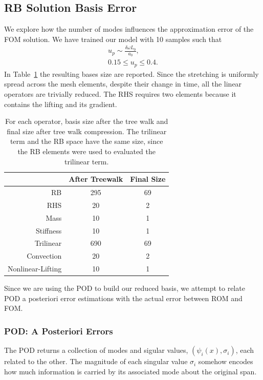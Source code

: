 \documentclass[../../thesis.tex]{subfiles}
\begin{document}
\subsection{RB Solution Basis Error}
\label{sec:hrom_results_reduced_basis}
We explore how the number of modes influences the approximation error of the FOM solution.
We have trained our model with 10 samples such that
\begin{align*}
    u_p \sim \frac{\delta \omega L_0}{a_0},
    \nonumber
    \\
    0.15 \leq u_p \leq 0.4.
\end{align*}
In Table~\ref{tab:uniform_stretching_basis_size} the resulting bases size are reported.
Since the stretching is uniformly spread across the mesh elements, despite their change in time,
all the linear operators are trivially reduced.
The RHS requires two elements because it contains the lifting and its gradient.
\begin{table}[!h]
    \caption{For each operator,
    basis size after the tree walk and final size after tree walk compression.
    The trilinear term and the RB space have the same size, 
    since the RB elements were used to evaluated the trilinear term.}
    \centering
    \begin{tabular}{@{}rcc@{}}
    \toprule
                      & After Treewalk & Final Size \\ \midrule
    RB                & 295            & 69                \\
    RHS               & 20             & 2                 \\
    Mass              & 10             & 1                 \\
    Stiffness         & 10             & 1                 \\
    Trilinear         & 690            & 69                \\
    Convection        & 20             & 2                 \\
    Nonlinear-Lifting & 10             & 1                 \\ \bottomrule
    \end{tabular}
    \label{tab:uniform_stretching_basis_size}
\end{table}
Since we are using the POD to build our reduced basis, 
we attempt to relate POD a posteriori error estimations with 
the actual error between ROM and FOM.

\subsubsection{POD: A Posteriori Errors}
The POD returns a collection of modes and sigular values, 
$(\psi_i(x), \sigma_i)$,
each related to the other.
The magnitude of each singular value $\sigma_i$ somehow encodes 
how much information is carried by its associated mode about the original span.
\end{document}
